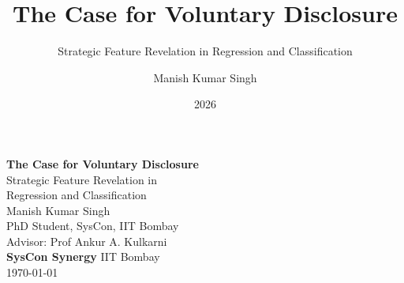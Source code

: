 \documentclass[aspectratio=169, 10pt]{beamer}
\title{The Case for Voluntary Disclosure}
\subtitle{Strategic Feature Revelation in Regression and Classification}
\author{Manish Kumar Singh}
\date{2026}
\institute{SysCon, IIT Bombay}
\begin{document}
{
\begin{frame}
  \vfill
  \begin{center}
    {\Huge\color{white}\textbf{The Case for Voluntary Disclosure}}\\[14pt]
    {\Large\color{accentCoral}Strategic Feature Revelation in\\Regression and Classification}\\[20pt]
    {\color{white!85}\large Manish Kumar Singh}\\[4pt]
    {\small\color{white!60}PhD Student, SysCon, IIT Bombay}\\[4pt]
    {\small\color{white!60}Advisor: Prof Ankur A. Kulkarni}\\[16pt]
    {\small\color{accentGold}\textbf{SysCon Synergy} \quad\textbar\quad IIT Bombay}\\[6pt]
    {\small\color{white!70}\today}
  \end{center}
  \vfill
\end{frame}
}
\end{document}
